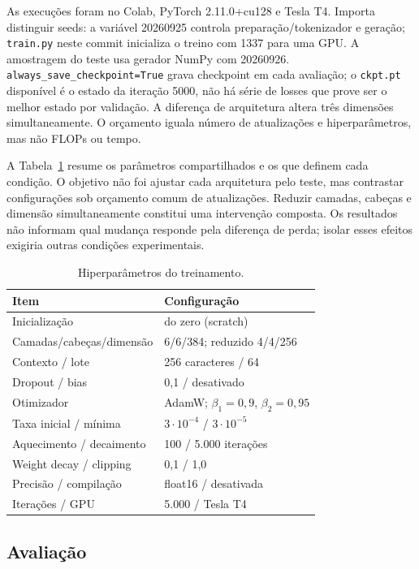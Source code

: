 \documentclass[conference]{IEEEtran}
\begin{document}
As execuções foram no Colab, PyTorch 2.11.0+cu128 e Tesla T4. Importa distinguir seeds: a variável 20260925 controla preparação/tokenizador e geração; \texttt{train.py} neste commit inicializa o treino com 1337 para uma GPU. A amostragem do teste usa gerador NumPy com 20260926. \texttt{always\_save\_checkpoint=True} grava checkpoint em cada avaliação; o \texttt{ckpt.pt} disponível é o estado da iteração 5000, não há série de losses que prove ser o melhor estado por validação. A diferença de arquitetura altera três dimensões simultaneamente. O orçamento iguala número de atualizações e hiperparâmetros, mas não FLOPs ou tempo.

A Tabela~\ref{tab:config} resume os parâmetros compartilhados e os que definem cada condição. O objetivo não foi ajustar cada arquitetura pelo teste, mas contrastar configurações sob orçamento comum de atualizações. Reduzir camadas, cabeças e dimensão simultaneamente constitui uma intervenção composta. Os resultados não informam qual mudança responde pela diferença de perda; isolar esses efeitos exigiria outras condições experimentais.

\begin{table}[t]
\caption{Hiperparâmetros do treinamento.}
\label{tab:config}
\centering
\begin{tabular}{ll}
\toprule
Item & Configuração \\
\midrule
Inicialização & do zero (scratch) \\
Camadas/cabeças/dimensão & 6/6/384; reduzido 4/4/256 \\
Contexto / lote & 256 caracteres / 64 \\
Dropout / bias & 0,1 / desativado \\
Otimizador & AdamW; $\beta_1=0{,}9$, $\beta_2=0{,}95$ \\
Taxa inicial / mínima & $3\cdot10^{-4}$ / $3\cdot10^{-5}$ \\
Aquecimento / decaimento & 100 / 5.000 iterações \\
Weight decay / clipping & 0,1 / 1,0 \\
Precisão / compilação & float16 / desativada \\
Iterações / GPU & 5.000 / Tesla T4 \\
\bottomrule
\end{tabular}
\end{table}

\subsection{Avaliação}
\end{document}
